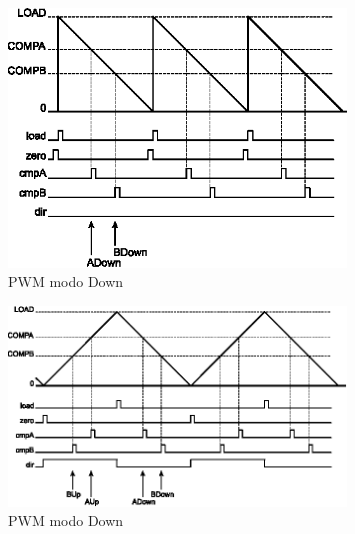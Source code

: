 
\begin{figure}[H]
\centering
\includegraphics[width=0.8\textwidth] {figuras/PWMCountDownMode.eps}
    \caption{PWM modo Down \cite{DATASHEET_TIVA}}
    \label{fig:PWMCountDownMode}
\end{figure}

\begin{figure}[H]
	\centering
	\includegraphics[width=0.8\textwidth] {figuras/PWMCountUpDownMode.eps}
	\caption{PWM modo Down \cite{DATASHEET_TIVA}}
	\label{fig:PWMCountUpDownMode}
\end{figure}